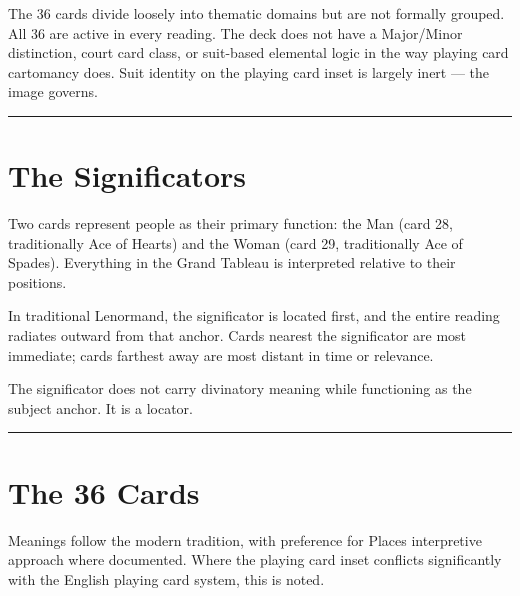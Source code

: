 The 36 cards divide loosely into thematic domains but are not formally grouped. All 36 are active in every reading. The deck does not have a Major/Minor distinction, court card class, or suit-based elemental logic in the way playing card cartomancy does. Suit identity on the playing card inset is largely inert --- the image governs.

\begin{center}\rule{0.5\linewidth}{0.5pt}\end{center}

\section{The Significators}\label{the-significators}

Two cards represent people as their primary function: the Man (card 28, traditionally Ace of Hearts) and the Woman (card 29, traditionally Ace of Spades). Everything in the Grand Tableau is interpreted relative to their positions.

In traditional Lenormand, the significator is located first, and the entire reading radiates outward from that anchor. Cards nearest the significator are most immediate; cards farthest away are most distant in time or relevance.

The significator does not carry divinatory meaning while functioning as the subject anchor. It is a locator.

\begin{center}\rule{0.5\linewidth}{0.5pt}\end{center}

\section{The 36 Cards}\label{the-36-cards}

Meanings follow the modern tradition, with preference for Place\textquotesingle s interpretive approach where documented. Where the playing card inset conflicts significantly with the English playing card system, this is noted.

